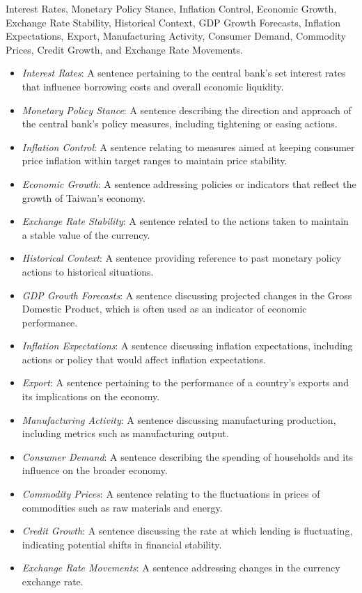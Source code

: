  Interest Rates, Monetary Policy Stance, Inflation Control, Economic Growth, Exchange Rate Stability, Historical Context, GDP Growth Forecasts, Inflation Expectations, Export, Manufacturing Activity, Consumer Demand, Commodity Prices, Credit Growth, and Exchange Rate Movements. 

\begin{itemize}
    \item \emph{Interest Rates}: A sentence pertaining to the central bank's set interest rates that influence borrowing costs and overall economic liquidity.
    \item \emph{Monetary Policy Stance}: A sentence describing the direction and approach of the central bank's policy measures, including tightening or easing actions.
    \item \emph{Inflation Control}: A sentence relating to measures aimed at keeping consumer price inflation within target ranges to maintain price stability.
    \item \emph{Economic Growth}: A sentence addressing policies or indicators that reflect the growth of Taiwan's economy.
    \item \emph{Exchange Rate Stability}: A sentence related to the actions taken to maintain a stable value of the currency.
    \item \emph{Historical Context}: A sentence providing reference to past monetary policy actions to historical situations.
    \item \emph{GDP Growth Forecasts}: A sentence discussing projected changes in the Gross Domestic Product, which is often used as an indicator of economic performance.
    \item \emph{Inflation Expectations}: A sentence discussing inflation expectations, including actions or policy that would affect inflation expectations.
    \item \emph{Export}: A sentence pertaining to the performance of a country’s exports and its implications on the economy.
    \item \emph{Manufacturing Activity}: A sentence discussing manufacturing production, including metrics such as manufacturing output.
    \item \emph{Consumer Demand}: A sentence describing the spending of households and its influence on the broader economy.
    \item \emph{Commodity Prices}: A sentence relating to the fluctuations in prices of commodities such as raw materials and energy.
    \item \emph{Credit Growth}: A sentence discussing the rate at which lending is fluctuating, indicating potential shifts in financial stability.
    \item \emph{Exchange Rate Movements}: A sentence addressing changes in the currency exchange rate.
\end{itemize}

